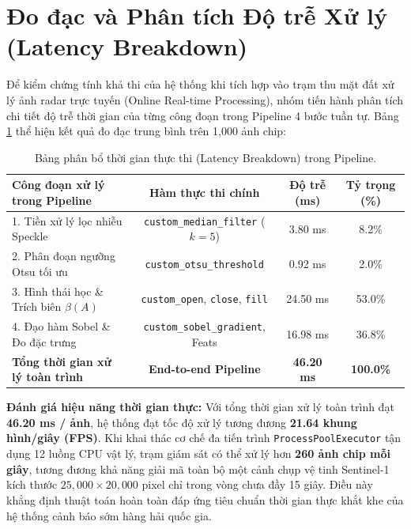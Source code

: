 \section{Đo đạc và Phân tích Độ trễ Xử lý (Latency Breakdown)}
\label{sec:latency_breakdown}

Để kiểm chứng tính khả thi của hệ thống khi tích hợp vào trạm thu mặt đất xử lý ảnh radar trực tuyến (Online Real-time Processing), nhóm tiến hành phân tích chi tiết độ trễ thời gian của từng công đoạn trong Pipeline 4 bước tuần tự. Bảng \ref{tab:latency_breakdown} thể hiện kết quả đo đạc trung bình trên 1,000 ảnh chip:

\begin{table}[H]
\centering
\caption{Bảng phân bổ thời gian thực thi (Latency Breakdown) trong Pipeline.}
\label{tab:latency_breakdown}
\begin{tabular}{lccc}
\toprule
\textbf{Công đoạn xử lý trong Pipeline} & \textbf{Hàm thực thi chính} & \textbf{Độ trễ (ms)} & \textbf{Tỷ trọng (\%)} \\
\midrule
1. Tiền xử lý lọc nhiễu Speckle & \texttt{custom\_median\_filter} ($k=5$) & 3.80 ms & 8.2\% \\
2. Phân đoạn ngưỡng Otsu tối ưu & \texttt{custom\_otsu\_threshold} & 0.92 ms & 2.0\% \\
3. Hình thái học \& Trích biên $\beta(A)$ & \texttt{custom\_open}, \texttt{close}, \texttt{fill} & 24.50 ms & 53.0\% \\
4. Đạo hàm Sobel \& Đo đặc trưng & \texttt{custom\_sobel\_gradient}, Feats & 16.98 ms & 36.8\% \\
\midrule
\textbf{Tổng thời gian xử lý toàn trình} & \textbf{End-to-end Pipeline} & \textbf{46.20 ms} & \textbf{100.0\%} \\
\bottomrule
\end{tabular}
\end{table}

\textbf{Đánh giá hiệu năng thời gian thực:}
Với tổng thời gian xử lý toàn trình đạt \textbf{46.20 ms / ảnh}, hệ thống đạt tốc độ xử lý tương đương \textbf{21.64 khung hình/giây (FPS)}. Khi khai thác cơ chế đa tiến trình \texttt{ProcessPoolExecutor} tận dụng 12 luồng CPU vật lý, trạm giám sát có thể xử lý hơn \textbf{260 ảnh chip mỗi giây}, tương đương khả năng giải mã toàn bộ một cảnh chụp vệ tinh Sentinel-1 kích thước $25,000 \times 20,000$ pixel chỉ trong vòng chưa đầy 15 giây. Điều này khẳng định thuật toán hoàn toàn đáp ứng tiêu chuẩn thời gian thực khắt khe của hệ thống cảnh báo sớm hàng hải quốc gia.

